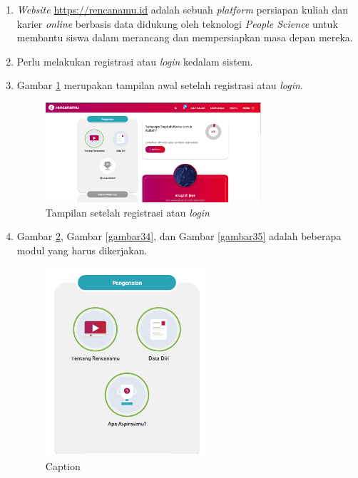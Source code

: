 \begin{enumerate}
    \item \textit{Website} \url{https://rencanamu.id} adalah sebuah \textit{platform} persiapan kuliah dan karier \textit{online} berbasis data didukung oleh teknologi \textit{People Science} untuk membantu siswa dalam merancang dan mempersiapkan masa depan mereka. 
    
    \item Perlu melakukan registrasi atau \textit{login} kedalam sistem.
    
    \item Gambar \ref{gambar32} merupakan tampilan awal setelah registrasi atau \textit{login}.
    
    \begin{figure}[H]
        \centering
        \includegraphics[width = 8cm, height = 5 cm]{doc/DokumenSkripsi/Gambar/gambar32.PNG}
        \caption{Tampilan setelah registrasi atau \textit{login}}
        \label{gambar32}
    \end{figure}
    
    \item Gambar \ref{gambar33}, Gambar \ref{gambar34}, dan Gambar \ref{gambar35} adalah beberapa modul yang harus dikerjakan.
    
    \begin{figure}[H]
        \centering
        \includegraphics[width = 6cm, height = 7cm ]{doc/DokumenSkripsi/Gambar/gambar33.PNG}
        \caption{Caption}
        \label{gambar33}
    \end{figure}
    

\end{enumerate}
